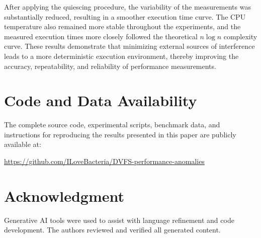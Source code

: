 \documentclass{article}
\begin{document}
After applying the quiescing procedure, the variability of the measurements was substantially reduced, resulting in a smoother execution time curve. The CPU temperature also remained more stable throughout the experiments, and the measured execution times more closely followed the theoretical \(n\log n\) complexity curve. These results demonstrate that minimizing external sources of interference leads to a more deterministic execution environment, thereby improving the accuracy, repeatability, and reliability of performance measurements.


\section*{Code and Data Availability}

The complete source code, experimental scripts, benchmark data, and instructions for reproducing the results presented in this paper are publicly available at:

\url{https://github.com/ILoveBacteria/DVFS-performance-anomalies}


\section*{Acknowledgment}

Generative AI tools \citep{openai_chatgpt_2026} were used to assist with language refinement and code development. The authors reviewed and verified all generated content.


  
\end{document}
